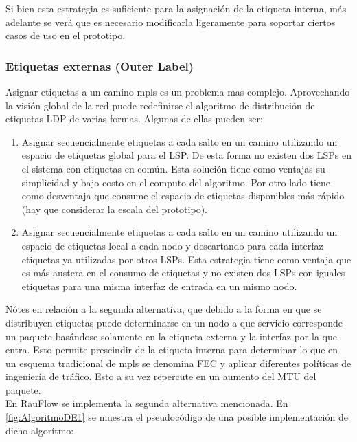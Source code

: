 Si bien esta estrategia es suficiente para la asignación de la etiqueta interna, m\'as adelante se ver\'a que es necesario modificarla ligeramente para soportar ciertos casos de uso en el prototipo.

\subsubsection{Etiquetas externas (Outer Label)}
Asignar etiquetas a un camino mpls es un problema mas complejo. Aprovechando la visión global de la red puede redefinirse el algoritmo de distribución de etiquetas LDP de varias formas. Algunas de ellas pueden ser:

\begin{enumerate}
\item Asignar secuencialmente etiquetas a cada salto en un camino utilizando un espacio de etiquetas global para el LSP. De esta forma no existen dos LSPs en el sistema con etiquetas en com\'un. Esta solución tiene como ventajas su simplicidad y bajo costo en el computo del algoritmo. Por otro lado tiene como desventaja que consume el espacio de etiquetas disponibles m\'as r\'apido (hay que considerar la escala del prototipo).

\item Asignar secuencialmente etiquetas a cada salto en un camino utilizando un espacio de etiquetas local a cada nodo y descartando para cada interfaz etiquetas ya utilizadas por otros LSPs. Esta estrategia tiene como ventaja que es m\'as austera en el consumo de etiquetas y no existen dos LSPs con iguales etiquetas para una misma interfaz de entrada en un mismo nodo.
\end{enumerate}

N\'otes en relación a la segunda alternativa, que debido a la forma en que se distribuyen etiquetas puede determinarse en un nodo a que servicio corresponde un paquete bas\'andose solamente en la etiqueta externa y la interfaz por la que entra. Esto permite prescindir de la etiqueta interna para determinar lo que en un esquema tradicional de mpls se denomina FEC y aplicar diferentes pol\'iticas de ingenier\'ia de tr\'afico. Esto a su vez repercute en un aumento del MTU del paquete.\\ 

En RauFlow se implementa la segunda alternativa mencionada. En \ref{fig:AlgoritmoDE1} se muestra el pseudoc\'odigo de una posible implementaci\'on de dicho algor\'itmo:\\

